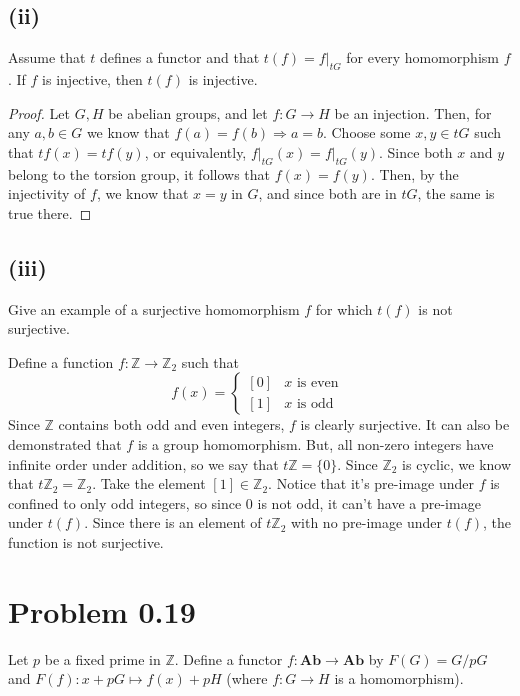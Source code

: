 \documentclass{article}
\theoremstyle{definition}
\begin{document}
    \subsection*{(ii)}
        \begin{mdframed}[]
            Assume that $t$ defines a functor and that $t(f) = f\bigg|_{tG}$ for every homomorphism $f$.
            If $f$ is injective, then $t(f)$ is injective.
        \end{mdframed}
        \begin{proof}
            Let $G,H$ be abelian groups, and let $f:G \rightarrow H$ be an injection.
            Then, for any $a,b \in G$ we know that $f(a) = f(b) \Longrightarrow a = b$.
            Choose some $x,y \in tG$ such that $tf(x) = tf(y)$, or equivalently, $f\bigg|_{tG}(x) = f\bigg|_{tG}(y)$.
            Since both $x$ and $y$ belong to the torsion group, it follows that $f(x) = f(y)$.
            Then, by the injectivity of $f$, we know that $x = y$ in $G$, and since both are in $tG$, the same is true there.
        \end{proof}
    \subsection*{(iii)}
        \begin{mdframed}[]
            Give an example of a surjective homomorphism $f$ for which $t(f)$ is not surjective.
        \end{mdframed}
        Define a function $f:\mathbb{Z} \rightarrow \mathbb{Z}_2$ such that 
        \[
            f(x) = \begin{cases}
                [0] & x \text{ is even }\\
                [1] & x \text{ is odd }
            \end{cases}  
        \]
        Since $\mathbb{Z}$ contains both odd and even integers, $f$ is clearly surjective.
        It can also be demonstrated that $f$ is a group homomorphism.
        But, all non-zero integers have infinite order under addition, so we say that $t\mathbb{Z} = \{0\}$.
        Since $\mathbb{Z}_2$ is cyclic, we know that $t\mathbb{Z}_2 = \mathbb{Z}_2$.
        Take the element $[1] \in \mathbb{Z}_2$.
        Notice that it's pre-image under $f$ is confined to only odd integers, so since 0 is not odd,
        it can't have a pre-image under $t(f)$.
        Since there is an element of $t\mathbb{Z}_2$ with no pre-image under $t(f)$, the function is not surjective.
\section{Problem 0.19}
    Let $p$ be a fixed prime in $\mathbb{Z}$.
    Define a functor $f: \bm{Ab} \rightarrow \bm{Ab}$ by $F(G) = G / pG$ and 
    $F(f):x + pG \mapsto f(x) + pH$ (where $f: G \rightarrow H$ is a homomorphism).
\end{document}
